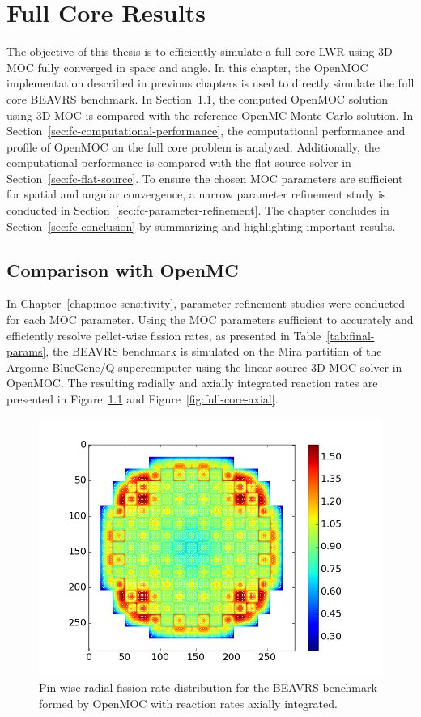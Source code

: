 \chapter{Full Core Results}
\label{chap:full-core-results}

The objective of this thesis is to efficiently simulate a full core \ac{LWR} using 3D \ac{MOC} fully converged in space and angle. In this chapter, the OpenMOC implementation described in previous chapters is used to directly simulate the full core BEAVRS benchmark. In Section~\ref{sec:openmc-compare}, the computed OpenMOC solution using 3D \ac{MOC} is compared with the reference OpenMC Monte Carlo solution. In Section~\ref{sec:fc-computational-performance}, the computational performance and profile of OpenMOC on the full core problem is analyzed. Additionally, the computational performance is compared with the flat source solver in Section~\ref{sec:fc-flat-source}. To ensure the chosen \ac{MOC} parameters are sufficient for spatial and angular convergence, a narrow parameter refinement study is conducted in Section~\ref{sec:fc-parameter-refinement}. The chapter concludes in Section~\ref{sec:fc-conclusion} by summarizing and highlighting important results.

\section{Comparison with OpenMC}
\label{sec:openmc-compare}

In Chapter~\ref{chap:moc-sensitivity}, parameter refinement studies were conducted for each \ac{MOC} parameter. Using the \ac{MOC} parameters sufficient to accurately and efficiently resolve pellet-wise fission rates, as presented in Table~\ref{tab:final-params}, the BEAVRS benchmark is simulated on the Mira partition of the Argonne BlueGene/Q supercomputer using the linear source 3D \ac{MOC} solver in OpenMOC. The resulting radially and axially integrated reaction rates are presented in Figure~\ref{fig:full-core-radial} and Figure~\ref{fig:full-core-axial}.

\begin{figure}[ht!]
	\centering
	\includegraphics[width=0.8\linewidth]{figures/results/rr-plots/beavrs-3d-radial.png}
	\caption{Pin-wise radial fission rate distribution for the BEAVRS benchmark formed by OpenMOC with reaction rates axially integrated.}
	\label{fig:full-core-radial}
\end{figure}

